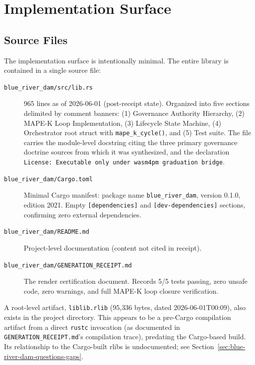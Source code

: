 
\section{Implementation Surface}
\label{sec:blue-river-dam-implementation}

\subsection{Source Files}
\label{sec:blue-river-dam-implementation-sources}

The implementation surface is intentionally minimal. The entire library is
contained in a single source file:

\begin{description}
  \item[\texttt{blue\_river\_dam/src/lib.rs}] 965 lines as of 2026-06-01
    (post-receipt state). Organized into five sections delimited by comment
    banners: (1) Governance Authority Hierarchy, (2) MAPE-K Loop
    Implementation, (3) Lifecycle State Machine, (4) Orchestrator root struct
    with \texttt{mape\_k\_cycle()}, and (5) Test suite. The file carries the
    module-level docstring citing the three primary governance doctrine sources
    from which it was synthesized, and the declaration
    \texttt{License: Executable only under wasm4pm graduation bridge}.
  \item[\texttt{blue\_river\_dam/Cargo.toml}] Minimal Cargo manifest: package
    name \texttt{blue\_river\_dam}, version 0.1.0, edition 2021. Empty
    \texttt{[dependencies]} and \texttt{[dev-dependencies]} sections, confirming
    zero external dependencies.
  \item[\texttt{blue\_river\_dam/README.md}] Project-level documentation
    (content not cited in receipt).
  \item[\texttt{blue\_river\_dam/GENERATION\_RECEIPT.md}] The render
    certification document. Records 5/5 tests passing, zero unsafe code, zero
    warnings, and full MAPE-K loop closure verification.
\end{description}

A root-level artifact, \texttt{liblib.rlib} (95{,}336 bytes, dated
2026-06-01T00:09), also exists in the project directory. This appears to be a
pre-Cargo compilation artifact from a direct \texttt{rustc} invocation
(as documented in \texttt{GENERATION\_RECEIPT.md}'s compilation trace), predating
the Cargo-based build. Its relationship to the Cargo-built rlibs is
undocumented; see Section~\ref{sec:blue-river-dam-questions-gaps}.

